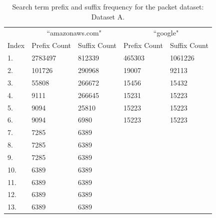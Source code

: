\documentclass{article}
\begin{document}
\begin{table}[h!bt]
  \centering
  \begin{tabular}{l|l|l||l|l}
    & \multicolumn{2}{c}{``amazonaws.com"} & \multicolumn{2}{c}{``google"} \\
    Index & Prefix Count & Suffix Count & Prefix Count & Suffix Count \\
    \hline
    1. & 2783497 & 812339 & 465303 & 1061226\\
    2. & 101726 & 290968 & 19007 & 92113\\
    3. & 55808 & 266672 & 15456 & 15432\\
    4. & 9111 & 266645 & 15231 & 15223\\
    5. & 9094 & 25810 & 15223 & 15223\\
    6. & 9094 & 6980 & 15223 & 15223\\
    7. & 7285 & 6389 & &\\
    8. & 7285 & 6389 & &\\
    9. & 7285 & 6389 & &\\
    10. & 6389 & 6389 & &\\
    11. & 6389 & 6389 & &\\
    12. & 6389 & 6389 & &\\
    13. & 6389 & 6389 & &
  \end{tabular}
  \caption{Search term prefix and suffix frequency for the packet dataset: Dataset A.}
\end{table}
\end{document}
